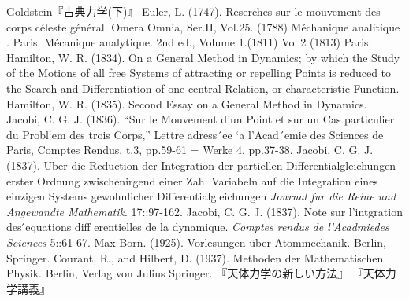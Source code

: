 \documentclass[uplatex, dvipdfmx]{jsreport}
\begin{document}
\begin{thebibliography}{99}
    Goldstein『古典力学(下)』
    Euler, L. (1747). Reserches sur le mouvement des corps céleste général. Omera Omnia, Ser.II, Vol.25.
    (1788) Méchanique analitique . Paris.
    Mécanique analytique. 2nd ed., Volume 1.(1811) Vol.2 (1813) Paris.
    Hamilton, W. R. (1834). On a General Method in Dynamics; by which the Study of the Motions of all
    free Systems of attracting or repelling Points is reduced to the Search and Differentiation
    of one central Relation, or characteristic Function.
    Hamilton, W. R. (1835). Second Essay on a General Method in Dynamics.
    Jacobi, C. G. J. (1836).
    “Sur le Mouvement d’un Point et sur un Cas particulier du Probl`em des trois Corps,” Lettre adress´ee
`a l’Acad´emie des Sciences de Paris, Comptes Rendus, t.3, pp.59-61 = Werke 4, pp.37-38.
    Jacobi, C. G. J. (1837). Uber die Reduction der Integration der partiellen Differentialgleichungen erster Ordnung zwischenirgend einer Zahl Variabeln auf die Integration eines einzigen Systems gewohnlicher Differentialgleichungen \textit{Journal fur die Reine und Angewandte Mathematik}. 17::97-162.
    Jacobi, C. G. J. (1837). Note sur l’intgration des ́equations diff erentielles de la dynamique. \textit{Comptes rendus de l’Acadmiedes Sciences} 5::61-67.
    Max Born. (1925). Vorlesungen über Atommechanik. Berlin, Springer.
    Courant, R., and Hilbert, D. (1937). Methoden der Mathematischen Physik. Berlin, Verlag von Julius Springer.
    『天体力学の新しい方法』
    『天体力学講義』
\end{thebibliography}
\end{document}
